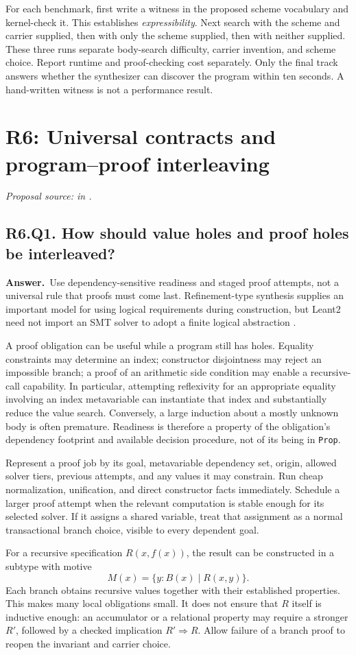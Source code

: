 \documentclass[11pt,a4paper]{article}
\theoremstyle{definition}
\theoremstyle{remark}
\newcommand{\code}[1]{\texttt{#1}}
\newcommand{\answer}{\par\noindent\textbf{Answer.}\ }
\newcommand{\sourcepart}[1]{\par\noindent\textit{Proposal source: #1 in \cite{proposal}.}}
\newcommand{\qheading}[2]{\subsection{#1. #2}}
\begin{document}
For each benchmark, first write a witness in the proposed scheme vocabulary
and kernel-check it. This establishes \emph{expressibility}. Next search with
the scheme and carrier supplied, then with only the scheme supplied, then with
neither supplied. These three runs separate body-search difficulty, carrier
invention, and scheme choice. Report runtime and proof-checking cost separately.
Only the final track answers whether the synthesizer can discover the program
within ten seconds. A hand-written witness is not a performance result.

\section{R6: Universal contracts and program--proof interleaving}
\label{sec:r6}
\sourcepart{}

\qheading{R6.Q1}{How should value holes and proof holes be interleaved?}
\answer Use dependency-sensitive readiness and staged proof attempts, not a
universal rule that proofs must come last. Refinement-type synthesis supplies
an important model for using logical requirements during construction, but
Leant2 need not import an SMT solver to adopt a finite logical abstraction
\cite{synquid}.

A proof obligation can be useful while a program still has holes. Equality
constraints may determine an index; constructor disjointness may reject an
impossible branch; a proof of an arithmetic side condition may enable a
recursive-call capability. In particular, attempting reflexivity for an
appropriate equality involving an index metavariable can instantiate that
index and substantially reduce the value search. Conversely, a large induction
about a mostly unknown body is often premature. Readiness is therefore a
property of the obligation's dependency footprint and available decision
procedure, not of its being in \code{Prop}.

Represent a proof job by its goal, metavariable dependency set, origin, allowed
solver tiers, previous attempts, and any values it may constrain. Run cheap
normalization, unification, and direct constructor facts immediately. Schedule
a larger proof attempt when the relevant computation is stable enough for its
selected solver. If it assigns a shared variable, treat that assignment as a
normal transactional branch choice, visible to every dependent goal.

For a recursive specification $R(x,f(x))$, the result can be constructed in a
subtype with motive
\[
 M(x)=\{y:B(x)\mid R(x,y)\}.
 \tag{16}
\]
Each branch obtains recursive values together with their established
properties. This makes many local obligations small. It does not ensure that
$R$ itself is inductive enough: an accumulator or a relational property may
require a stronger $R'$, followed by a checked implication $R'\Rightarrow R$.
Allow failure of a branch proof to reopen the invariant and carrier choice.
\end{document}
